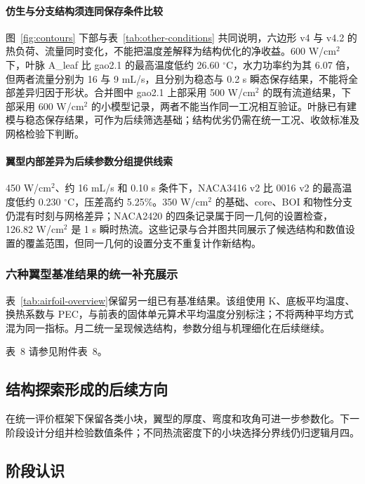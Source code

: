 \documentclass[stage2,fontset=fandol]{ydzjreport}
\makeatletter
\newcommand{\submissionnumber}[1]{\def\@currentlabel{#1}}
\makeatother
\begin{document}
\paragraph{仿生与分支结构须连同保存条件比较}
图~\ref{fig:contours} 下部与表~\ref{tab:other-conditions} 共同说明，六边形 v4 与 v4.2 的热负荷、流量同时变化，不能把温度差解释为结构优化的净收益。600 W/cm$^2$ 下，叶脉 A\_leaf 比 gao2.1 的最高温度低约 26.60 $^\circ$C，水力功率约为其 6.07 倍，但两者流量分别为 16 与 9 mL/s，且分别为稳态与 0.2 s 瞬态保存结果，不能将全部差异归因于形状。合并图中 gao2.1 上部采用 500 W/cm$^2$ 的既有流道结果，下部采用 600 W/cm$^2$ 的小模型记录，两者不能当作同一工况相互验证。叶脉已有建模与稳态保存结果，可作为后续筛选基础；结构优劣仍需在统一工况、收敛标准及网格检验下判断。

\paragraph{翼型内部差异为后续参数分组提供线索}
450 W/cm$^2$、约 16 mL/s 和 0.10 s 条件下，NACA3416 v2 比 0016 v2 的最高温度低约 0.230 $^\circ$C，压差高约 5.25\%。350 W/cm$^2$ 的基础、core、BOI 和物性分支仍混有时刻与网格差异；NACA2420 的四条记录属于同一几何的设置检查，126.82 W/cm$^2$ 是 1 s 瞬时热流。这些记录与合并图共同展示了候选结构和数值设置的覆盖范围，但同一几何的设置分支不重复计作新结构。

\subsubsection{六种翼型基准结果的统一补充展示}
表~\ref{tab:airfoil-overview}保留另一组已有基准结果。该组使用 K、底板平均温度、换热系数与 PEC，与前表的固体单元算术平均温度分别标注；不将两种平均方式混为同一指标。月二统一呈现候选结构，参数分组与机理细化在后续继续。

\par\noindent \begingroup\submissionnumber{8}\label{tab:airfoil-overview}\endgroup 表~8 请参见附件表~8。\par

\subsection{结构探索形成的后续方向}

在统一评价框架下保留各类小块，翼型的厚度、弯度和攻角可进一步参数化。下一阶段设计分组并检验数值条件；不同热流密度下的小块选择分界线仍归逻辑月四。

\subsection{阶段认识}
\end{document}
